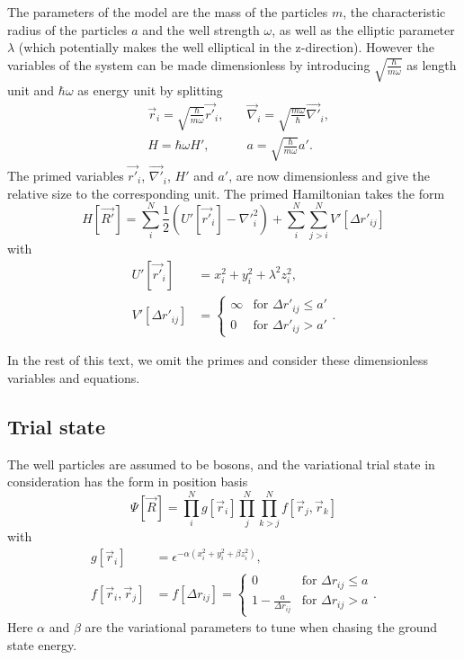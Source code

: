 \documentclass[a4paper,8pt]{article}
\begin{document}
\begin{multicols}{2}
The parameters of the model are the mass of the particles $m$, the characteristic radius of the particles $a$ and the well strength $\omega$, as well as the elliptic parameter $\lambda$ (which potentially makes the well elliptical in the z-direction). However the variables of the system can be made dimensionless by introducing $\sqrt{\frac{\hbar}{m\omega}}$ as length unit and $\hbar\omega$ as energy unit by splitting
\begin{align}
&\vec{r}_i = \sqrt{\frac{\hbar}{m\omega}}\vec{r'}_i, \quad &\vec{\nabla}_i = \sqrt{\frac{m\omega}{\hbar}}\vec{\nabla'}_i, \nonumber\\
&H = \hbar\omega H', \quad\quad &a = \sqrt{\frac{\hbar}{m\omega}}a'. \nonumber
\end{align}
The primed variables $\vec{r'}_i$, $\vec{\nabla'}_i$, $H'$ and $a'$, are now dimensionless and give the relative size to the corresponding unit. The primed Hamiltonian takes the form
\begin{equation}
H[\vec{R'}] = \sum\limits_i^N \frac{1}{2}\left( U'[\vec{r'}_i] - {\nabla'}_i^2\right) + \sum\limits_i^N\sum\limits_{j > i}^N V'[\Delta{r'}_{ij}] \label{Hamiltonian}
\end{equation}
with
\begin{align}
U'[\vec{r'}_i] &= x_i^2+y_i^2+\lambda^2z_i^2, \label{U}\\
V'[\Delta{r'}_{ij}] &=\begin{cases} \infty & \text{for $\Delta{r'}_{ij} \leq a'$} \\
0 & \text{for $\Delta{r'}_{ij} > a'$} \end{cases}. \label{V}
\end{align}

In the rest of this text, we omit the primes and consider these dimensionless variables and equations.

\subsection{Trial state} \label{trialstate}

The well particles are assumed to be bosons, and the variational trial state in consideration has the form in position basis
\begin{equation}
\Psi[\vec{R}] = \prod\limits_i^N g[\vec{r}_i] \prod\limits_j^N\prod\limits_{k > j}^N f[\vec{r}_j,\vec{r}_k] \label{trialstate}
\end{equation}
with
\begin{align}
g[\vec{r}_i] &= \epsilon^{-\alpha\left(x_i^2+y_i^2+ \beta z_i^2\right)}, \\
f[\vec{r}_i,\vec{r}_j] &= f[\Delta{r}_{ij}] = \begin{cases} 0 & \text{for $\Delta{r}_{ij} \leq a$} \\
1-\frac{a}{\Delta{r}_{ij}} & \text{for $\Delta{r}_{ij} > a$} \end{cases}.
\end{align}
Here $\alpha$ and $\beta$ are the variational parameters to tune when chasing the ground state energy.



\end{multicols}
\end{document}
